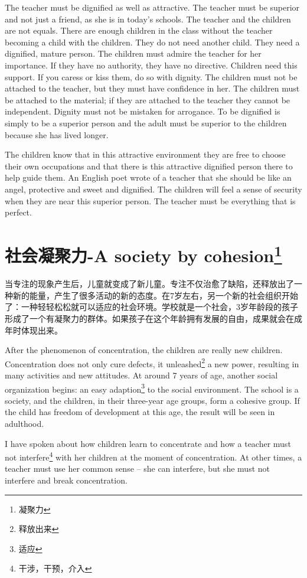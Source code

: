 \documentclass[lang=cn,10pt]{elegantbook}
\begin{document}
The teacher must be dignified as well as attractive. The teacher
must be superior and not just a friend, as she is in today’s schools.
The teacher and the children are not equals. There are enough
children in the class without the teacher becoming a child with the
children. They do not need another child. They need a dignified,
mature person. The children must admire the teacher for her
importance. If they have no authority, they have no directive.
Children need this support. If you caress or kiss them, do so with
dignity. The children must not be attached to the teacher, but they
must have confidence in her. The children must be attached to the
material; if they are attached to the teacher they cannot be
independent. Dignity must not be mistaken for arrogance. To be
dignified is simply to be a superior person and the adult must be
superior to the children because she has lived longer.

The children know that in this attractive environment they are
free to choose their own occupations and that there is this attractive
dignified person there to help guide them. An English poet wrote of a
teacher that she should be like an angel, protective and sweet and
dignified. The children will feel a sense of security when they are
near this superior person. The teacher must be everything that is
perfect.

\chapter{社会凝聚力-A society by cohesion\footnote{凝聚力}}

当专注的现象产生后，儿童就变成了新儿童。专注不仅治愈了缺陷，还释放出了一种新的能量，产生了很多活动的新的态度。在7岁左右，另一个新的社会组织开始了：一种轻轻松松就可以适应的社会环境。学校就是一个社会，3岁年龄段的孩子形成了一个有凝聚力的群体。如果孩子在这个年龄拥有发展的自由，成果就会在成年时体现出来。

After the phenomenon of concentration, the children are really new children. Concentration does not only cure defects, it unleashed\footnote{释放出来} a new power, resulting in many activities and new attitudes. At around 7 years of age, another social organization begins: an easy adaption\footnote{适应} to the social environment. The school is a society, and the children, in their three-year age groups, form a cohesive group. If the child has freedom of development at this age, the result will be seen in adulthood.

I have spoken about how children learn to concentrate and how a teacher must not interfere\footnote{干涉，干预，介入} with her children at the moment of concentration. At other times, a teacher must use her common sense – she can interfere, but she must not interfere and break concentration.
\end{document}
